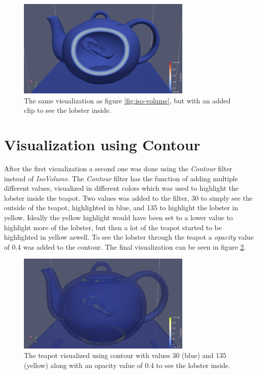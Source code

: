 \documentclass{article}
\begin{document}
    \begin{figure}[H]
        \centering
        \includegraphics[width=0.75\textwidth]{../img/teapot-iso-volume-clip.png}
        
        \caption{The same visualization as figure \ref{fig:iso-volume}, but with an added clip to see the lobster inside.}
        \label{fig:iso-volume-clip}
    \end{figure}

    \section{Visualization using Contour}
    After the first visualization a second one was done using the \textit{Contour} filter instead of \textit{IsoVolume}. The \textit{Contour} filter has the function of adding multiple different values, visualized in different colors which was used to highlight the lobster inside the teapot. Two values was added to the filter, 30 to simply see the outside of the teapot, highlighted in blue, and 135 to highlight the lobster in yellow. Ideally the yellow highlight would have been set to a lower value to highlight more of the lobster, but then a lot of the teapot started to be highlighted in yellow aswell. To see the lobster through the teapot a \textit{opacity} value of 0.4 was added to the contour. The final visualization can be seen in figure \ref{fig:contour}.

    \begin{figure}[H]
        \centering
        \includegraphics[width=0.75\textwidth]{../img/teapot-contour.png}
        
        \caption{The teapot visualized using contour with values 30 (blue) and 135 (yellow) along with an opacity value of 0.4 to see the lobster inside.}
        \label{fig:contour}
    \end{figure}
\end{document}
